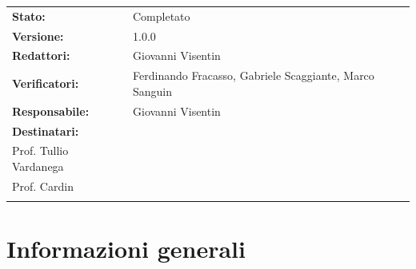 \documentclass[a4paper,12pt]{article}
\begin{document}
\begin{tcolorbox}
\begin{tabularx}{\textwidth}{@{}l X@{}}
\textbf{Stato:} & Completato \\
\textbf{Versione:} & 1.0.0 \\
\textbf{Redattori:} & Giovanni Visentin \\
\textbf{Verificatori:} & Ferdinando Fracasso, Gabriele Scaggiante, Marco Sanguin \\
\textbf{Responsabile:} & Giovanni Visentin \\
\textbf{Destinatari:} & 
\begin{tabular}[t]{@{}l@{}}
Miriade \\
Prof. Tullio Vardanega \\
Prof. Cardin \\
\end{tabular} \\
\end{tabularx}
\end{tcolorbox}

\vspace*{\fill} %
\clearpage

\clearpage
\tableofcontents
\thispagestyle{empty} %
\clearpage

\section{Informazioni generali}
\renewcommand{\arraystretch}{1.3}
\end{document}
